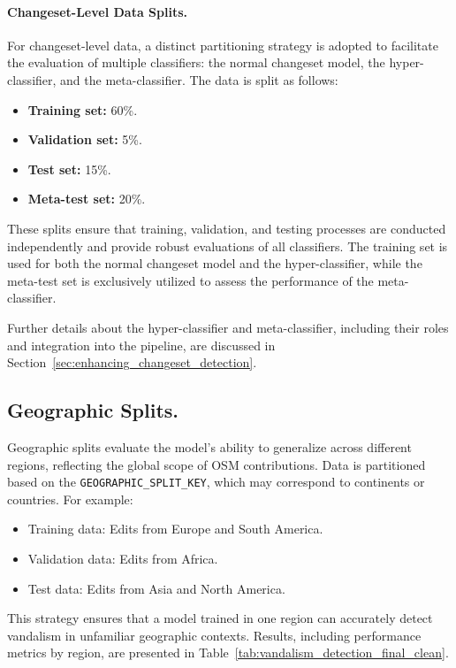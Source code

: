 \documentclass[
    13pt, %
    a4paper, %
    DIV14, %
    listof=totoc, %
    bibliography=totoc, %
    index=totoc, %
    headsepline
]{scrreprt}
\begin{document}
\paragraph{Changeset-Level Data Splits.}
For changeset-level data, a distinct partitioning strategy is adopted to facilitate the evaluation of multiple classifiers: the normal changeset model, the hyper-classifier, and the meta-classifier. The data is split as follows:

\begin{itemize}
    \item \textbf{Training set:} 60\%.
    \item \textbf{Validation set:} 5\%.
    \item \textbf{Test set:} 15\%.
    \item \textbf{Meta-test set:} 20\%.
\end{itemize}

These splits ensure that training, validation, and testing processes are conducted independently and provide robust evaluations of all classifiers. The training set is used for both the normal changeset model and the hyper-classifier, while the meta-test set is exclusively utilized to assess the performance of the meta-classifier.

Further details about the hyper-classifier and meta-classifier, including their roles and integration into the pipeline, are discussed in Section~\ref{sec:enhancing_changeset_detection}.

\subsection{Geographic Splits.}
Geographic splits evaluate the model's ability to generalize across different regions, reflecting the global scope of OSM contributions. Data is partitioned based on the \texttt{GEOGRAPHIC\_SPLIT\_KEY}, which may correspond to continents or countries. For example:
\begin{itemize}
    \item Training data: Edits from Europe and South America.
    \item Validation data: Edits from Africa.
    \item Test data: Edits from Asia and North America.
\end{itemize}

This strategy ensures that a model trained in one region can accurately detect vandalism in unfamiliar geographic contexts. Results, including performance metrics by region, are presented in Table~\ref{tab:vandalism_detection_final_clean}.
\end{document}
